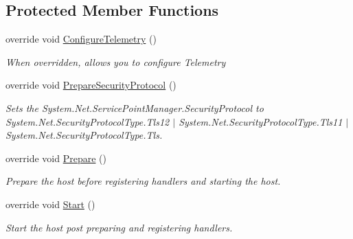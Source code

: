 \subsection*{Protected Member Functions}
\begin{DoxyCompactItemize}
\item 
override void \hyperlink{classCqrs_1_1Azure_1_1ConfigurationManager_1_1TelemetryCoreHost_abcb4e14f33f2b85b95a2b80c4555748a_abcb4e14f33f2b85b95a2b80c4555748a}{Configure\+Telemetry} ()
\begin{DoxyCompactList}\small\item\em When overridden, allows you to configure Telemetry \end{DoxyCompactList}\item 
override void \hyperlink{classCqrs_1_1Azure_1_1ConfigurationManager_1_1TelemetryCoreHost_a0e920d0139b12319847f8ec1deb12f3b_a0e920d0139b12319847f8ec1deb12f3b}{Prepare\+Security\+Protocol} ()
\begin{DoxyCompactList}\small\item\em Sets the System.\+Net.\+Service\+Point\+Manager.\+Security\+Protocol to System.\+Net.\+Security\+Protocol\+Type.\+Tls12 $\vert$ System.\+Net.\+Security\+Protocol\+Type.\+Tls11 $\vert$ System.\+Net.\+Security\+Protocol\+Type.\+Tls. \end{DoxyCompactList}\item 
override void \hyperlink{classCqrs_1_1Azure_1_1ConfigurationManager_1_1TelemetryCoreHost_a620cb9c1ceb78a8f23b45ae749199fd4_a620cb9c1ceb78a8f23b45ae749199fd4}{Prepare} ()
\begin{DoxyCompactList}\small\item\em Prepare the host before registering handlers and starting the host. \end{DoxyCompactList}\item 
override void \hyperlink{classCqrs_1_1Azure_1_1ConfigurationManager_1_1TelemetryCoreHost_a37c8e3f829743d6be1108b3fd8a5a3e7_a37c8e3f829743d6be1108b3fd8a5a3e7}{Start} ()
\begin{DoxyCompactList}\small\item\em Start the host post preparing and registering handlers. \end{DoxyCompactList}\end{DoxyCompactItemize}
